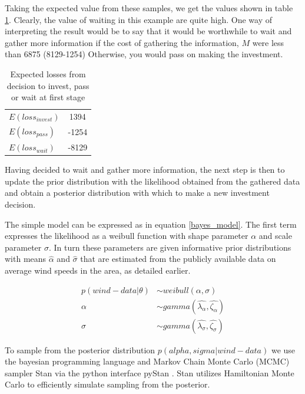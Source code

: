 \documentclass[11pt]{article}
\begin{document}
Taking the expected value from these samples, we get the values shown in table \ref{table:expected_losses}. Clearly, the value of waiting in this example are quite high. One way of interpreting the result would be to say that it would be worthwhile to wait and gather more information if the cost of gathering the information, $M$ were less than 6875 (8129-1254) Otherwise, you would pass on making the investment. 

\begin{table}
\begin{center}
\begin{tabular}{l c}
$E(loss_{invest})$ & 1394 \\
$E(loss_{pass})$ & -1254 \\
$E(loss_{wait})$ & -8129 \\

\end{tabular}
\caption{Expected losses from decision to invest, pass or wait at first stage}
\label{table:expected_losses}
\end{center}
\end{table}

Having decided to wait and gather more information, the next step is then to update the prior distribution with the likelihood obtained from the gathered data and obtain a posterior distribution with which to make a new investment decision.

The simple model can be expressed as in equation \ref{bayes_model}. The first term expresses the likelihood as a weibull function with shape parameter $\alpha$ and scale parameter $\sigma$. In turn these parameters are given informative prior distributions with means $\hat{\alpha}$ and $\hat{\sigma}$ that are estimated from the publicly available data on average wind speeds in the area, as detailed earlier.   

\begin{align}
p(wind-data|\theta) &\sim weibull(\alpha, \sigma)\\
\alpha &\sim gamma(\hat{\lambda_{\alpha}}, \hat{\zeta_{\alpha}})\\
\sigma &\sim gamma(\hat{\lambda_{\sigma}}, \hat{\zeta_{\sigma}})
\label{bayes_model}
\end{align}

To sample from the posterior distribution $p(alpha, sigma|wind-data)$ we use the bayesian programming language and Markov Chain Monte Carlo (MCMC) sampler Stan via the python interface pyStan \citep{stan_development_team_pystan:_2014}. Stan utilizes Hamiltonian Monte Carlo to efficiently simulate sampling from the posterior. 
\end{document}
